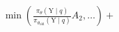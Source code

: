 \documentclass[preview]{standalone}
\begin{document}
\begin{align*}
\min \left( \frac{\pi_\theta(\text{Y} \mid q)}{\pi_{\theta_{\text{old}}}(\text{Y} \mid q)} A_2, \dots \right) +
\end{align*}
\end{document}
